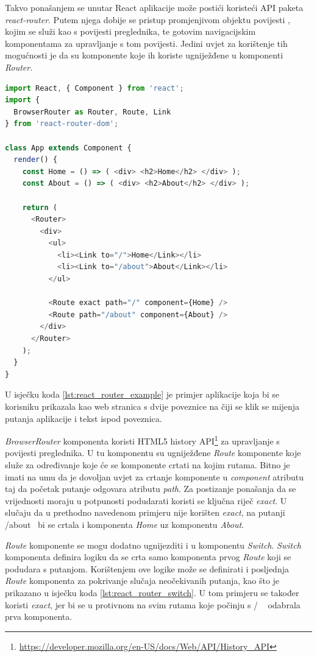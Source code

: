\documentclass[times, utf8, zavrsni, numeric]{fer}
\newcommand{\razmakp}{\vspace{18pt}}
\newcommand{\razmaks}{\vspace{10pt}}
\begin{document}
Takvo ponašanjem se unutar React aplikacije može postići koristeći API paketa \emph{react-router}.
Putem njega dobije se pristup promjenjivom objektu povijesti , kojim se služi kao s povijesti preglednika, te gotovim navigacijskim komponentama za upravljanje s tom povijesti.
Jedini uvjet za korištenje tih mogućnosti je da su komponente koje ih koriste ugniježđene u komponenti \emph{Router}\citep{reactRouter}.

\razmakp
\begin{lstlisting}[language=JavaScript, caption={Primjer korištenja \emph{react-router}}, label={lst:react_router_example}]
import React, { Component } from 'react';
import { 
  BrowserRouter as Router, Route, Link
} from 'react-router-dom';

class App extends Component {
  render() {
    const Home = () => ( <div> <h2>Home</h2> </div> );
    const About = () => ( <div> <h2>About</h2> </div> );

    return (
      <Router>
        <div>
          <ul>
            <li><Link to="/">Home</Link></li>
            <li><Link to="/about">About</Link></li>
          </ul>

          <Route exact path="/" component={Home} />
          <Route path="/about" component={About} />
        </div>
      </Router>
    );
  }
}
\end{lstlisting}
\razmaks

U isječku koda \ref{lst:react_router_example} je primjer aplikacije koja bi se korisniku prikazala kao web stranica s dvije poveznice na čiji se klik se mijenja putanja aplikacije i tekst ispod poveznica.

\emph{BrowserRouter} komponenta koristi HTML5 history API\footnote{\url{https://developer.mozilla.org/en-US/docs/Web/API/History_API}} za upravljanje s povijesti preglednika.
U tu komponentu su ugniježđene \emph{Route} komponente koje služe za određivanje koje će se komponente crtati na kojim rutama.
Bitno je imati na umu da je dovoljan uvjet za crtanje komponente u \emph{component} atributu taj da početak putanje odgovara atributu \emph{path}.
Za postizanje ponašanja da se vrijednosti moraju u potpunosti podudarati koristi se ključna riječ \emph{exact}.
U slučaju da u prethodno navedenom primjeru nije korišten \emph{exact}, na putanji \glqq /about\grqq ~ bi se crtala i komponenta \emph{Home} uz komponentu \emph{About}.

\emph{Route} komponente se mogu dodatno ugnijezditi i u komponentu \emph{Switch}.
\emph{Switch} komponenta definira logiku da se crta samo komponenta prvog \emph{Route} koji se podudara s putanjom.
Korištenjem ove logike može se definirati i posljednja \emph{Route} komponenta za pokrivanje slučaja neočekivanih putanja, kao što je prikazano u isječku koda \ref{lst:react_router_switch}.
U tom primjeru se također koristi \emph{exact}, jer bi se u protivnom na svim rutama koje počinju s \glqq / \grqq ~ odabrala prva komponenta.
\end{document}
